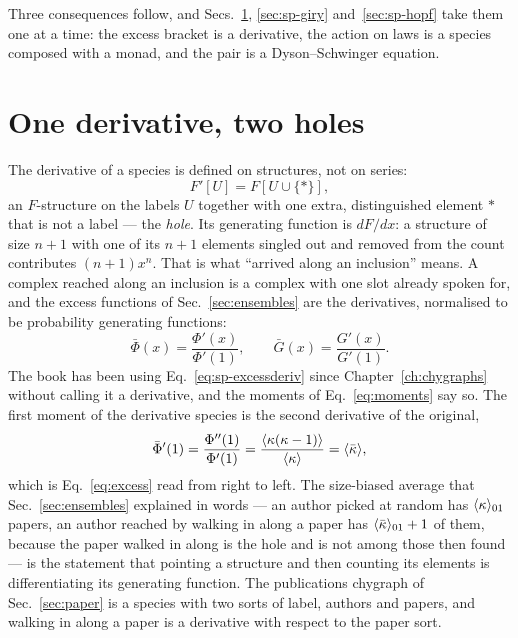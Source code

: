 Three consequences follow, and Secs.~\ref{sec:sp-holes}, \ref{sec:sp-giry}
and~\ref{sec:sp-hopf} take them one at a time: the excess bracket is a
derivative, the action on laws is a species composed with a monad, and the
pair is a Dyson--Schwinger equation.

\section{One derivative, two holes}
\label{sec:sp-holes}

The derivative of a species is defined on structures, not on series:
\begin{equation}
  F'[U]=F[U\cup\{\ast\}],
  \label{eq:sp-derivative}
\end{equation}
an $F$-structure on the labels $U$ together with one extra, distinguished
element $\ast$ that is not a label --- the \emph{hole}. Its generating
function is $dF/dx$: a structure of size $n+1$ with one of its $n+1$ elements
singled out and removed from the count contributes $(n+1)x^{n}$. That is what
``arrived along an inclusion'' means. A complex reached along an inclusion is
a complex with one slot already spoken for, and the excess functions of
Sec.~\ref{sec:ensembles} are the derivatives, normalised to be probability
generating functions:
\begin{equation}
  \bar\Phi(x)=\frac{\Phi'(x)}{\Phi'(1)},\qquad
  \bar G(x)=\frac{G'(x)}{G'(1)} .
  \label{eq:sp-excessderiv}
\end{equation}
The book has been using Eq.~\eqref{eq:sp-excessderiv} since
Chapter~\ref{ch:chygraphs} without calling it a derivative, and the moments
of Eq.~\eqref{eq:moments} say so. The first moment of the derivative species
is the second derivative of the original,
\[
  \bar\Phi'(1)=\frac{\Phi''(1)}{\Phi'(1)}
              =\frac{\langle \kappa(\kappa-1) \rangle}{\langle \kappa \rangle}=\langle \bar\kappa \rangle,
\]
which is Eq.~\eqref{eq:excess} read from right to left. The size-biased
average that Sec.~\ref{sec:ensembles} explained in words --- an author
picked at random has $\langle \kappa \rangle_{01}$ papers, an author reached by walking
in along a paper has $\langle \bar\kappa \rangle_{01}+1$ of them, because the paper walked in
along is the hole and is not among those then found --- is the statement
that pointing a structure and then counting its elements is differentiating
its generating function. The publications chygraph of Sec.~\ref{sec:paper} is
a species with two sorts of label, authors and papers, and walking in along a
paper is a derivative with respect to the paper sort.

